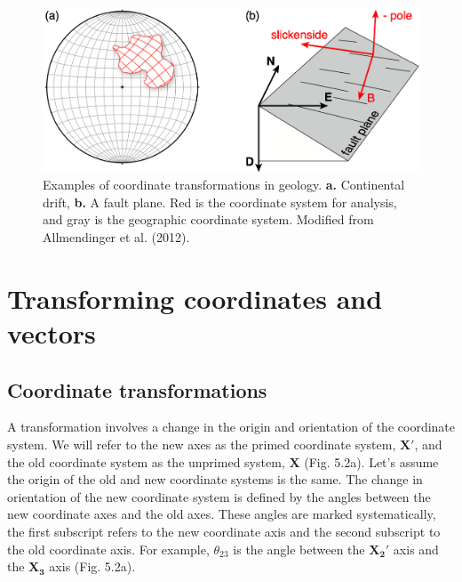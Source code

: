 \documentclass[a4paper , 12pt]{book}
\begin{document}
 \begin{figure}[ht]
    \centering
    \includegraphics[width=12cm]{Figures/ch5f1.png}
    \caption{Examples of coordinate transformations in geology. \textbf{a.} Continental drift, \textbf{b.} A fault plane. Red is the coordinate system for analysis, and gray is the geographic coordinate system. Modified from Allmendinger et al. (2012).}
\end{figure}

\section{Transforming coordinates and vectors}

\subsection{Coordinate transformations}

A transformation involves a change in the origin and orientation of the coordinate system. We will refer to the new axes as the primed coordinate system, $\mathbf{X\text{$'$}}$, and the old coordinate system as the unprimed system, $\mathbf{X}$ (Fig. 5.2a). Let's assume the origin of the old and new coordinate systems is the same. The change in orientation of the new coordinate system is defined by the angles between the new coordinate axes and the old axes. These angles are marked systematically, the first subscript refers to the new coordinate axis and the second subscript to the old coordinate axis. For example, $\theta_{23}$ is the angle between the $\mathbf{X_2\text{$'$}}$ axis and the $\mathbf{X_3}$ axis (Fig. 5.2a). 
\end{document}
